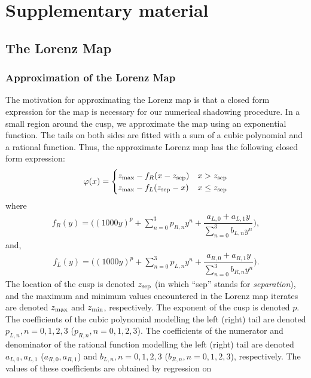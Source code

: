 \section{Supplementary material}
\subsection{The Lorenz Map}
\subsubsection{Approximation of the Lorenz Map}
The motivation for approximating the Lorenz map is that a 
closed form expression for the map is necessary for our numerical shadowing procedure. In a small region around the cusp, we approximate the map using an exponential function. The tails on both sides are fitted with a sum of a cubic polynomial and a rational function. Thus, the approximate Lorenz map has the 
following closed form expression:
\begin{align}
    \varphi(x) = \begin{cases}
        z_{\rm max} - f_R(x - z_{\rm sep})   &  x > z_{\rm sep} \\
        z_{\rm max} -  f_L(z_{\rm sep} - x)   &  x \leq z_{\rm sep}
    \end{cases}
\end{align}
where 
\begin{align}
    f_R(y) = \Big( (1000 y)^p + 
        \sum_{n=0}^3 p_{R,n} y^n + \dfrac{a_{L,0} + a_{L,1} y}{\sum_{n=0}^3 b_{L,n} y^n}\Big),
\end{align}
and,
\begin{align}
    f_L(y) = \Big((1000 y)^p 
        + \sum_{n=0}^3 p_{L,n} y^n + \dfrac{a_{R,0} + a_{R,1}y}{\sum_{n=0}^3 b_{R,n} y^n}\Big).
\end{align}
The location of the cusp is denoted $z_{\rm sep}$ (in which ``sep'' stands 
for \emph{separation}), and the maximum and minimum values encountered 
in the Lorenz map iterates are denoted $z_{\rm max}$ and $z_{\rm min}$, respectively. The exponent of the cusp is denoted $p$. The coefficients of the cubic polynomial modelling the left (right) tail are  denoted $p_{L,n}, n = 0,1,2,3$ ($p_{R,n}, n = 0,1,2,3$). The coefficients of the numerator and denominator of the rational function modelling the left (right) tail are denoted $a_{L,0}, a_{L,1}$ ($a_{R,0}, a_{R,1}$) and $b_{L,n}, n=0,1,2,3$ ($b_{R,n}, n=0,1,2,3$), respectively. The values of these coefficients are obtained by 
regression on 
